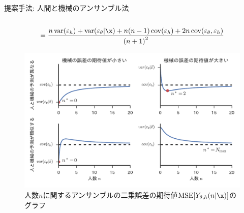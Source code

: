 \documentclass[dvipdfmx]{beamer}
\DeclareMathOperator{\MSE}{MSE}
\DeclareMathOperator{\var}{var}
\DeclareMathOperator{\cov}{cov}
\newcommand{\varm}{\var(\varepsilon_\theta|\x)}
\newcommand{\varh}{\var(\varepsilon_h)}
\newcommand{\covh}{\cov(\varepsilon_h)}
\newcommand{\covmh}{\cov(\varepsilon_\theta, \varepsilon_h)}
\begin{document}
\begin{frame}{}
\begin{block}{提案手法: 人間と機械のアンサンブル法}
\begin{columns}
\begin{column}{.54\textwidth}
\begin{itembox}[l]{}
\begin{equation*}
              = \frac{n\varh + \varm + n(n - 1)\covh + 2n\covmh}{{(n + 1)}^2}
            \label{eq: expected squared error}
          \end{equation*}
          \begin{figure}
            \centering
            \includegraphics[width=.8\textwidth]{poster-ensemble_graph.pdf}
            \caption{人数$n$に関するアンサンブルの二乗誤差の期待値$\MSE[Y_{\theta,h}(n|\x)]$のグラフ}
          \end{figure}
        \end{itembox}
      \end{column}
    \end{columns}
  \end{block}


\end{frame}
\end{document}
